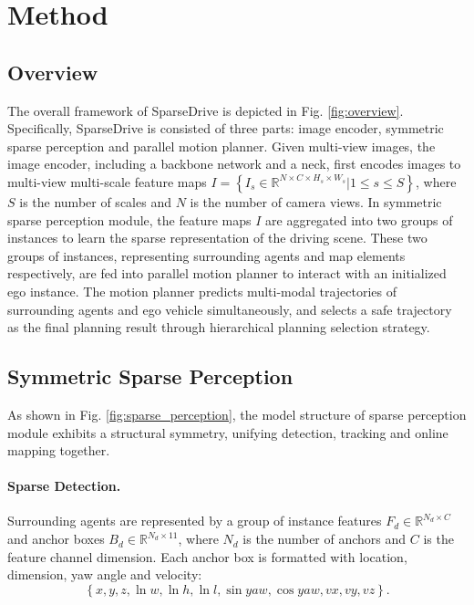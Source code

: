 

\section{Method}
\subsection{Overview}
The overall framework of SparseDrive is depicted in Fig. \ref{fig:overview}. Specifically, SparseDrive is consisted of three parts: image encoder, symmetric sparse perception and parallel motion planner. Given multi-view images, the image encoder, including a backbone network and a neck, first encodes images to multi-view multi-scale feature maps $I=\left\{I_s \in \mathbb{R}^{N \times C \times H_s \times W_s} | 1 \leq s \leq S \right\}$, where $S$ is the number of scales and $N$ is the number of camera views. In symmetric sparse perception module, the feature maps $I$ are aggregated into two groups of instances to learn the sparse representation of the driving scene. These two groups of instances, representing surrounding agents and map elements respectively, are fed into parallel motion planner to interact with an initialized ego instance. The motion planner predicts multi-modal trajectories of surrounding agents and ego vehicle simultaneously, and selects a safe trajectory as the final planning result through hierarchical planning selection strategy.

\subsection{Symmetric Sparse Perception}
As shown in Fig. \ref{fig:sparse_perception}, the model structure of sparse perception module exhibits a structural symmetry, unifying detection, tracking and online mapping together.

\paragraph{Sparse Detection.}
Surrounding agents are represented by a group of instance features $F_d \in \mathbb{R}^{N_d \times C}$ and anchor boxes $B_d \in \mathbb{R}^{N_d \times 11}$, where $N_d$ is the number of anchors and $C$ is the feature channel dimension. Each anchor box is formatted  with location, dimension, yaw angle and velocity:
\[ \left\{ x, y, z, \ln w, \ln h, \ln l, \sin{yaw}, \cos{yaw}, vx, vy, vz\right\}. \]

